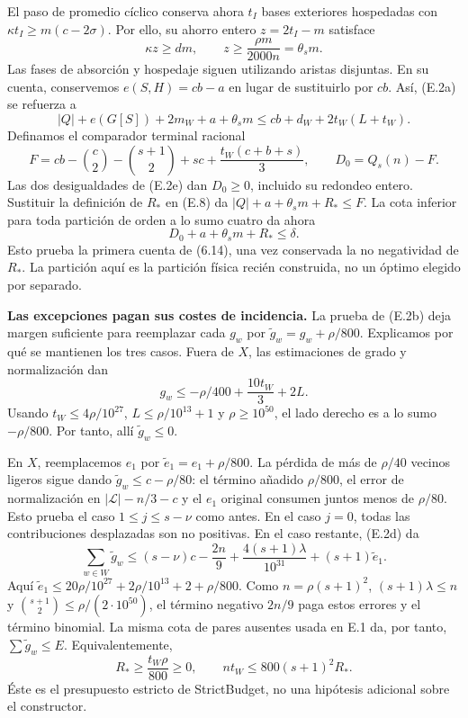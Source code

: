 \documentclass[spanish,11pt,a4paper]{article}
\begin{document}
El paso de promedio cíclico conserva ahora \(t_I\) bases exteriores hospedadas con \(\kappa t_I\ge m(c-2\sigma)\). Por ello, su ahorro entero \(z=2t_I-m\) satisface \[
\kappa z\ge dm,\qquad
z\ge\frac{\rho m}{2000n}=\theta_s m.
\tag{E.7}
\] Las fases de absorción y hospedaje siguen utilizando aristas disjuntas. En su cuenta, conservemos \(e(S,H)=cb-a\) en lugar de sustituirlo por \(cb\). Así, (E.2a) se refuerza a \[
|Q|+e(G[S])+2m_W+a+\theta_s m
\le cb+d_W+2t_W(L+t_W).
\tag{E.8}
\] Definamos el comparador terminal racional \[
F=cb-\binom c2-\binom{s+1}2+sc+
       \frac{t_W(c+b+s)}3,\qquad
D_0=Q_s(n)-F.
\] Las dos desigualdades de (E.2e) dan \(D_0\ge0\), incluido su redondeo entero. Sustituir la definición de \(R_*\) en (E.8) da \(|Q|+a+\theta_s m+R_*\le F\). La cota inferior para toda partición de orden a lo sumo cuatro da ahora \[
D_0+a+\theta_s m+R_*\le\delta.
\tag{E.9}
\] Esto prueba la primera cuenta de (6.14), una vez conservada la no negatividad de \(R_*\). La partición aquí es la partición física recién construida, no un óptimo elegido por separado.

\textbf{Las excepciones pagan sus costes de incidencia.} La prueba de (E.2b) deja margen suficiente para reemplazar cada \(g_w\) por \(\widetilde g_w=g_w+\rho/800\). Explicamos por qué se mantienen los tres casos. Fuera de \(X\), las estimaciones de grado y normalización dan \[
g_w\le-\rho/400+\frac{10t_W}{3}+2L.
\] Usando \(t_W\le4\rho/10^{27}\), \(L\le\rho/10^{13}+1\) y \(\rho\ge10^{50}\), el lado derecho es a lo sumo \(-\rho/800\). Por tanto, allí \(\widetilde g_w\le0\).

En \(X\), reemplacemos \(e_1\) por \(\widetilde e_1=e_1+\rho/800\). La pérdida de más de \(\rho/40\) vecinos ligeros sigue dando \(\widetilde g_w\le c-\rho/80\): el término añadido \(\rho/800\), el error de normalización en \(|\mathcal L|-n/3-c\) y el \(e_1\) original consumen juntos menos de \(\rho/80\). Esto prueba el caso \(1\le j\le s-\nu\) como antes. En el caso \(j=0\), todas las contribuciones desplazadas son no positivas. En el caso restante, (E.2d) da \[
\sum_{w\in W}\widetilde g_w
\le(s-\nu)c-\frac{2n}{9}+
  \frac{4(s+1)\lambda}{10^{31}}+(s+1)\widetilde e_1.
\] Aquí \(\widetilde e_1\le20\rho/10^{27}+2\rho/10^{13}+2+\rho/800\). Como \(n=\rho(s+1)^2\), \((s+1)\lambda\le n\) y \(\binom{s+1}{2}\le\rho/(2\cdot10^{50})\), el término negativo \(2n/9\) paga estos errores y el término binomial. La misma cota de pares ausentes usada en E.1 da, por tanto, \(\sum\widetilde g_w\le E\). Equivalentemente, \[
R_*\ge\frac{t_W\rho}{800}\ge0,\qquad
nt_W\le800(s+1)^2R_*.
\tag{E.10}
\] Éste es el presupuesto estricto de StrictBudget, no una hipótesis adicional sobre el constructor.
\end{document}
